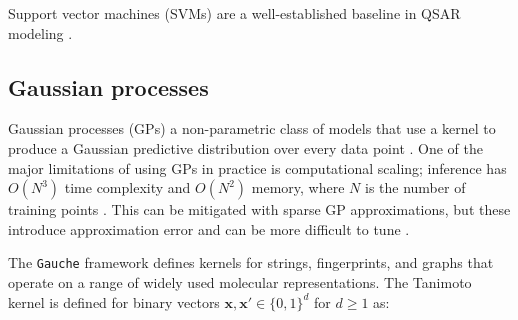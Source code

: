 Support vector machines (SVMs) are a well-established baseline in QSAR modeling \citep{Vapnik1995, Svetnik2003}.

\subsection{Gaussian processes}

Gaussian processes (GPs) a non-parametric class of models that use a kernel to produce a Gaussian predictive distribution over every data point \citep{Obrezanova2007, Rasmussen2005}. One of the major limitations of using GPs in practice is computational scaling; inference has $O(N^3)$ time complexity and $O(N^2)$ memory, where $N$ is the number of training points \citep{Rasmussen2005}. This can be mitigated with sparse GP approximations, but these introduce approximation error and can be more difficult to tune \citep{quinonero2005}.


The \texttt{Gauche} framework \citep{gauche} defines kernels for strings, fingerprints, and graphs that operate on a range of widely used molecular representations. The Tanimoto kernel \citep{Ralaivola2005, moss2020} is defined for binary vectors $\mathbf{x}, \mathbf{x}' \in \{0, 1\}^d$ for $d \geq 1$ as:


